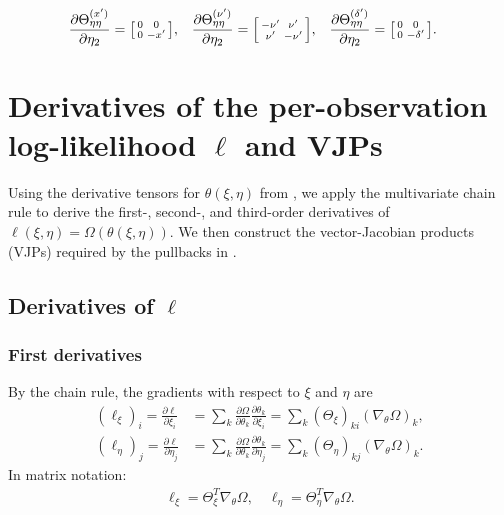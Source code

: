 \documentclass{article}
\begin{document}
\begin{align}
  \frac{\partial \Theta_{\eta\eta}^{(x')}}{\partial \eta_2} & = \begin{bsmallmatrix} 0 & 0 \\ 0 & -x' \end{bsmallmatrix}, &  & \frac{\partial \Theta_{\eta\eta}^{(\nu')}}{\partial \eta_2} = \begin{bsmallmatrix} -\nu' & \nu' \\ \nu' & -\nu' \end{bsmallmatrix}, &  & \frac{\partial \Theta_{\eta\eta}^{(\delta')}}{\partial \eta_2} = \begin{bsmallmatrix} 0 & 0 \\ 0 & -\delta' \end{bsmallmatrix} \label{eq:third-derivative-theta-log-sigma-eta-eta}.
\end{align}

\section{Derivatives of the per-observation log-likelihood $\ell$ and VJPs}\label{app:ell-derivatives}

Using the derivative tensors for $\theta(\xi,\eta)$ from , we apply the multivariate chain rule to derive the first-, second-, and third-order derivatives of $\ell(\xi,\eta) = \Omega(\theta(\xi,\eta))$.
We then construct the vector-Jacobian products (VJPs) required by the pullbacks in .

\subsection{Derivatives of $\ell$}

\subsubsection{First derivatives}

By the chain rule, the gradients with respect to $\xi$ and $\eta$ are
%
\begin{align}
  (\ell_\xi)_i = \frac{\partial \ell}{\partial \xi_i}   & = \sum_k \frac{\partial \Omega}{\partial \theta_k} \frac{\partial \theta_k}{\partial \xi_i} = \sum_k (\Theta_\xi)_{ki} (\nabla_\theta \Omega)_k,   \\
  (\ell_\eta)_j = \frac{\partial \ell}{\partial \eta_j} & = \sum_k \frac{\partial \Omega}{\partial \theta_k} \frac{\partial \theta_k}{\partial \eta_j} = \sum_k (\Theta_\eta)_{kj} (\nabla_\theta \Omega)_k.
\end{align}
%
In matrix notation:
%
\begin{align}
  \ell_\xi = \Theta_{\xi}^{T} \nabla_\theta \Omega, \quad \ell_\eta = \Theta_{\eta}^{T} \nabla_\theta \Omega.
\end{align}
\end{document}
